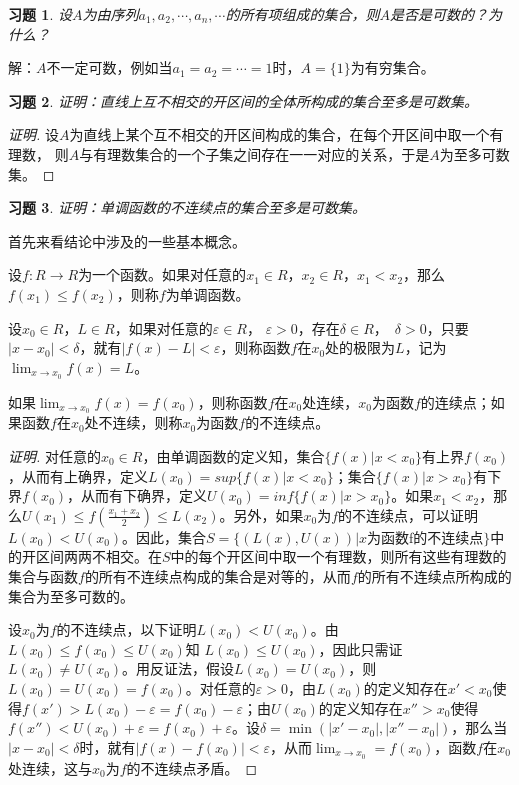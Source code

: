 \documentclass{article}
\begin{document}
\begin{CJK}{UTF8}{gbsn}
\newtheorem{Exercise}{习题}
\begin{Exercise}
设$A$为由序列$a_1,a_2,\cdots,a_n,\cdots$的所有项组成的集合，则$A$是否是可数的？为什么？
\end{Exercise}
解：$A$不一定可数，例如当$a_1=a_2=\cdots=1$时，$A=\{1\}$为有穷集合。
\begin{Exercise}
  证明：直线上互不相交的开区间的全体所构成的集合至多是可数集。
\end{Exercise}
\begin{proof}[证明]
  设$A$为直线上某个互不相交的开区间构成的集合，在每个开区间中取一个有理数，
  则$A$与有理数集合的一个子集之间存在一一对应的关系，于是$A$为至多可数集。
\end{proof}
\begin{Exercise}
  证明：单调函数的不连续点的集合至多是可数集。
\end{Exercise}

首先来看结论中涉及的一些基本概念。

设$f:R\to R$为一个函数。如果对任意的$x_1\in R$，$x_2\in R$，$x_1< x_2$，那么$f(x_1) \leq f(x_2)$，则称$f$为单调函数。

设$x_0\in R$，$L\in R$，如果对任意的$\varepsilon\in R$， $\varepsilon> 0$，存在$\delta \in R$，　$\delta > 0$，只要$|x-x_0|<\delta$，就有$|f(x) - L|<\varepsilon$，则称函数$f$在$x_0$处的极限为$L$，记为$\lim_{x\to x_0}f(x)=L$。

如果$\lim_{x\to x_0}f(x)=f(x_0)$，则称函数$f$在$x_0$处连续，$x_0$为函数$f$的连续点；如果函数$f$在$x_0$处不连续，则称$x_0$为函数$f$的不连续点。


\begin{proof}[证明]
  对任意的$x_0\in R$，由单调函数的定义知，集合$\{f(x)|x<x_0\}$有上界$f(x_0)$，从而有上确界，定义$L(x_0)=sup \{f(x)|x<x_0\}$；集合$\{f(x)|x>x_0\}$有下界$f(x_0)$，从而有下确界，定义$U(x_0)=inf \{f(x)|x>x_0\}$。如果$x_1<x_2$，那么$U(x_1)\leq f(\frac{x_1+x_2}{2}) \leq L(x_2)$。另外，如果$x_0$为$f$的不连续点，可以证明$L(x_0) <  U(x_0)$。因此，集合$S=\{(L(x),U(x))|x\text{为函数}$f$\text{的不连续点}\}$中的开区间两两不相交。在$S$中的每个开区间中取一个有理数，则所有这些有理数的集合与函数$f$的所有不连续点构成的集合是对等的，从而$f$的所有不连续点所构成的集合为至多可数的。

  设$x_0$为$f$的不连续点，以下证明$L(x_0) <  U(x_0)$。由$L(x_0)\leq f(x_0) \leq U(x_0)$知 $L(x_0) \leq U(x_0)$，因此只需证$L(x_0)\neq U(x_0)$。用反证法，假设$L(x_0)=U(x_0)$，则$L(x_0)=U(x_0)=f(x_0)$。对任意的$\varepsilon >0$，由$L(x_0)$的定义知存在$x'<x_0$使得$f(x')>L(x_0)-\varepsilon=f(x_0)-\varepsilon$；由$U(x_0)$的定义知存在$x''>x_0$使得$f(x'')<U(x_0) + \varepsilon=f(x_0) + \varepsilon$。设$\delta = \min (|x'-x_0|, |x''-x_0|)$，那么当$|x-x_0|< \delta$时，就有$|f(x)-f(x_0)|<\varepsilon$，从而$\lim_{x\to x_0}=f(x_0)$，函数$f$在$x_0$处连续，这与$x_0$为$f$的不连续点矛盾。
\end{proof}


\end{CJK}
\end{document}
